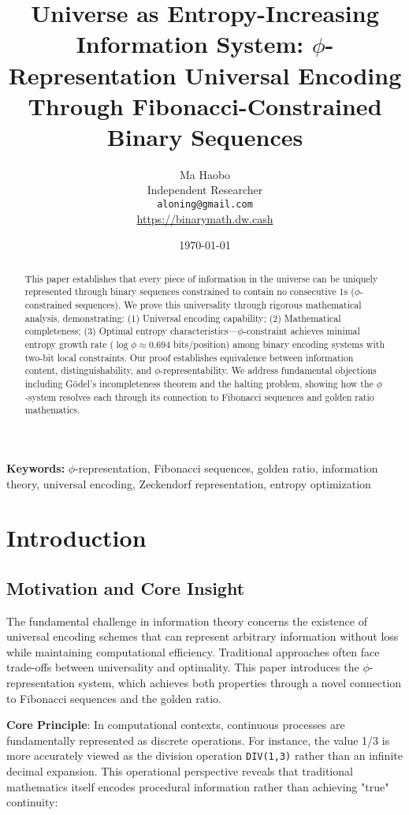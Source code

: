 \documentclass[12pt,letterpaper]{article}
\title{Universe as Entropy-Increasing Information System: $\phi$-Representation Universal Encoding Through Fibonacci-Constrained Binary Sequences}
\author{Ma Haobo\\
Independent Researcher\\
\texttt{aloning@gmail.com}\\
\url{https://binarymath.dw.cash}}
\date{\today}
\begin{document}
\maketitle

\begin{abstract}
This paper establishes that every piece of information in the universe can be uniquely represented through binary sequences constrained to contain no consecutive 1s ($\phi$-constrained sequences). We prove this universality through rigorous mathematical analysis, demonstrating: (1) Universal encoding capability; (2) Mathematical completeness; (3) Optimal entropy characteristics—$\phi$-constraint achieves minimal entropy growth rate ($\log \phi \approx 0.694$ bits/position) among binary encoding systems with two-bit local constraints. Our proof establishes equivalence between information content, distinguishability, and $\phi$-representability. We address fundamental objections including Gödel's incompleteness theorem and the halting problem, showing how the $\phi$-system resolves each through its connection to Fibonacci sequences and golden ratio mathematics.
\end{abstract}

\textbf{Keywords:} $\phi$-representation, Fibonacci sequences, golden ratio, information theory, universal encoding, Zeckendorf representation, entropy optimization

\thispagestyle{empty}
\newpage

\tableofcontents
\newpage

\section{Introduction}

\subsection{Motivation and Core Insight}

The fundamental challenge in information theory concerns the existence of universal encoding schemes that can represent arbitrary information without loss while maintaining computational efficiency. Traditional approaches often face trade-offs between universality and optimality. This paper introduces the $\phi$-representation system, which achieves both properties through a novel connection to Fibonacci sequences and the golden ratio.

\textbf{Core Principle}: In computational contexts, continuous processes are fundamentally represented as discrete operations. For instance, the value 1/3 is more accurately viewed as the division operation \texttt{DIV(1,3)} rather than an infinite decimal expansion. This operational perspective reveals that traditional mathematics itself encodes procedural information rather than achieving "true" continuity:
\end{document}
